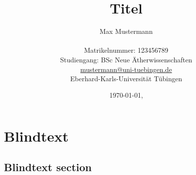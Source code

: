 \documentclass[
11pt,
bibliography=totoc,
numbers=noenddot,
]{scrbook}
\title{Titel}
\author{{\LARGE Max Mustermann} \\
		\\
		Matrikelnummer: 123456789\\
		Studiengang: BSc Neue Ätherwissenschaften \\
		\url{mustermann@uni-tuebingen.de}\\ 
		Eberhard-Karls-Universität Tübingen\\}
\date{\ddmmyyyydate\today, \currenttime}
\begin{document}
\maketitle
\frontmatter
\tableofcontents
\mainmatter 



\chapter{Blindtext}

\lipsum

\section{Blindtext section}

\lipsum


\insertBib
\end{document}
